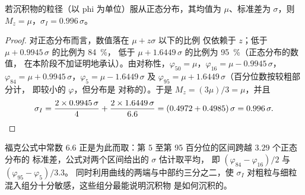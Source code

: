 \begin{proposition}[正态分布的图解度量]\label{prop:b1:clastic-sediments:normal}
若沉积物的粒径（以 phi 为单位）服从正态分布，其均值为
$\mu$、标准差为 $\sigma$，则 $M_z = \mu$，$\sigma_I = 0.996\,\sigma$。
\end{proposition}

\begin{proof}
对正态分布而言，数值落在 $\mu + z\sigma$ 以下的比例
仅依赖于 $z$；低于 $\mu + 0.9945\,\sigma$ 的比例为 \qty{84}{\percent}，
低于 $\mu + 1.6449\,\sigma$ 的比例为 \qty{95}{\percent}（正态分布的数值，
在本阶段不加证明地承认）。由对称性，$\varphi_{50} = \mu$，$\varphi_{16} = \mu -
0.9945\,\sigma$，$\varphi_{84} = \mu + 0.9945\,\sigma$，$\varphi_5 = \mu -
1.6449\,\sigma$ 及 $\varphi_{95} = \mu + 1.6449\,\sigma$（百分位数按较粗部分计，
即较小的 $\varphi$，但分布是
对称的）。于是 $M_z = (3\mu)/3 = \mu$，并且
\[
  \sigma_I = \frac{2 \times 0.9945\,\sigma}{4} + \frac{2 \times 1.6449\,\sigma}{6.6}
  = (0.4972 + 0.4985)\,\sigma = 0.996\,\sigma. \qedhere
\]
\end{proof}

福克公式中常数 6.6 正是为此而取：第
5 至第 95 百分位的区间跨越 $3.29$ 个正态分布的
标准差，公式对两个区间给出的 $\sigma$ 估计取平均，
即 $(\varphi_{84}-\varphi_{16})/2$ 与 $(\varphi_{95}-\varphi_5)/3.3$。
同时利用曲线的两端与中部约三分之二，使 $\sigma_I$
对粗粒与细粒混入组分十分敏感，这些组分最能说明沉积物
是如何沉积的。

